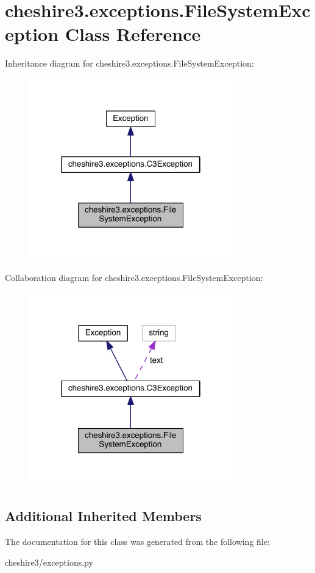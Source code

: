 \hypertarget{classcheshire3_1_1exceptions_1_1_file_system_exception}{\section{cheshire3.\-exceptions.\-File\-System\-Exception Class Reference}
\label{classcheshire3_1_1exceptions_1_1_file_system_exception}
}


Inheritance diagram for cheshire3.\-exceptions.\-File\-System\-Exception\-:
\nopagebreak
\begin{figure}[H]
\begin{center}
\leavevmode
\includegraphics[width=250pt]{classcheshire3_1_1exceptions_1_1_file_system_exception__inherit__graph}
\end{center}
\end{figure}


Collaboration diagram for cheshire3.\-exceptions.\-File\-System\-Exception\-:
\nopagebreak
\begin{figure}[H]
\begin{center}
\leavevmode
\includegraphics[width=250pt]{classcheshire3_1_1exceptions_1_1_file_system_exception__coll__graph}
\end{center}
\end{figure}
\subsection*{Additional Inherited Members}


The documentation for this class was generated from the following file\-:\begin{DoxyCompactItemize}
\item 
cheshire3/exceptions.\-py\end{DoxyCompactItemize}
